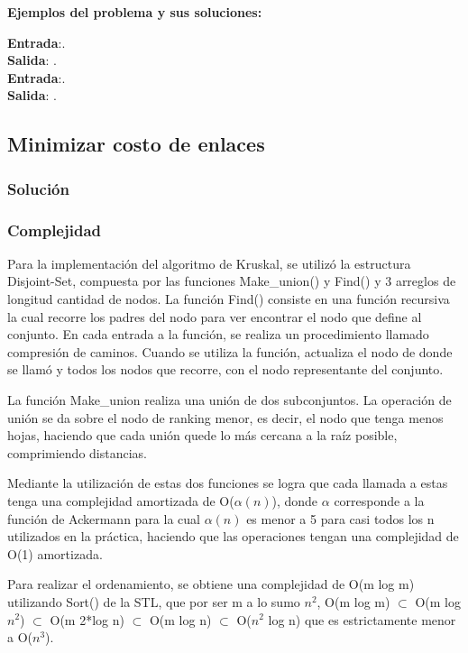\documentclass[a4paper, 10pt, twoside]{article}
\begin{document}
\textbf{Ejemplos del problema y sus soluciones:}

\textbf{Entrada}:. \\
\textbf{Salida}: . \\

\textbf{Entrada}:. \\
\textbf{Salida}: . \\

\subsection{Minimizar costo de enlaces}

\subsubsection{Solución}

\subsubsection{Complejidad}
Para la implementación del algoritmo de Kruskal, se utilizó la estructura Disjoint-Set, compuesta por las funciones Make\_union() y Find() y 3 arreglos de longitud cantidad de nodos.
La función Find() consiste en una función recursiva la cual recorre los padres del nodo para ver encontrar el nodo que define al conjunto. En cada entrada a la función, se realiza un procedimiento llamado compresión de caminos. Cuando se utiliza la función, actualiza el nodo de donde se llamó y todos los nodos que recorre, con el nodo representante del conjunto.

La función Make\_union realiza una unión de dos subconjuntos. La operación de unión se da sobre el nodo de ranking menor, es decir, el nodo que tenga menos hojas, haciendo que cada unión quede lo más cercana a la raíz posible, comprimiendo distancias.

Mediante la utilización de estas dos funciones se logra que cada llamada a estas tenga una complejidad amortizada de O($\alpha(n)$), donde $\alpha$ corresponde a la función de Ackermann para la cual $\alpha(n)$ es menor a 5 para casi todos los n utilizados en la práctica, haciendo que las operaciones tengan una complejidad de O(1) amortizada.

Para realizar el ordenamiento, se obtiene una complejidad de O(m log m) utilizando Sort() de la STL, que por ser m a lo sumo $n^2$, O(m log m) $\subset$ O(m log $n^2$) $\subset$ O(m 2*log n) $\subset$ O(m log n) $\subset$ O($n^2$ log n) que es estrictamente menor a O($n^3$).
\end{document}
